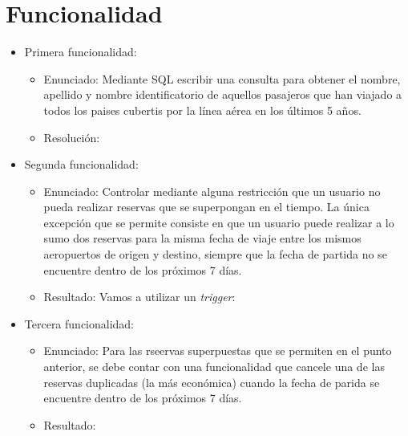 \section{Funcionalidad}

\begin{itemize}
	\item Primera funcionalidad:
		\begin{itemize}
			\item Enunciado: Mediante SQL escribir una consulta para obtener el nombre, apellido y nombre
			identificatorio de aquellos pasajeros que han viajado a todos los paises cubertis por la l\'inea
			a\'erea en los \'ultimos 5 a\~nos.

			\item Resoluci\'on:

			
		\end{itemize}
	\item Segunda funcionalidad:
		\begin{itemize}
			\item Enunciado: Controlar mediante alguna restricci\'on que un usuario no pueda realizar
			reservas que se superpongan en el tiempo. La \'unica excepci\'on que se permite consiste en
			que un usuario puede realizar a lo sumo dos reservas para la misma fecha de viaje entre los
			mismos aeropuertos de origen y destino, siempre que la fecha de partida no se encuentre dentro
			de los pr\'oximos 7 d\'ias.
			\item Resultado: Vamos a utilizar un \textit{trigger}:

			
		\end{itemize}
	\item Tercera funcionalidad:
		\begin{itemize}
			\item Enunciado: Para las rseervas superpuestas que se permiten en el punto anterior, se debe
			contar con una funcionalidad que cancele una de las reservas duplicadas (la m\'as econ\'omica)
			cuando la fecha de parida se encuentre dentro de los pr\'oximos 7 d\'ias.
			
			\item Resultado:
			
			
		\end{itemize}
\end{itemize}

